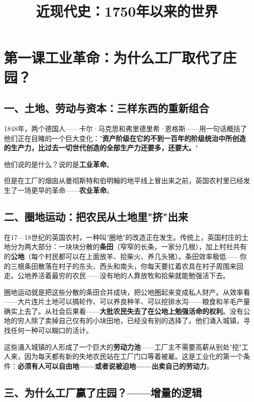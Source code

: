 \documentclass[a4paper,12pt]{ctexart}
\title{\textcolor{blue!70!black}{\Huge\textbf{近现代史：1750年以来的世界}}}
\author{}
\date{}
\begin{document}
\maketitle
\thispagestyle{empty}

\tableofcontents
\newpage

\section{\textcolor{orange!80!black}{第一课\quad 工业革命：为什么工厂取代了庄园？}}

\subsection*{一、土地、劳动与资本：三样东西的重新组合}

1848年，两个德国人——卡尔·马克思和弗里德里希·恩格斯——用一句话概括了他们正在目睹的一个巨大变化："\textbf{资产阶级在它的不到一百年的阶级统治中所创造的生产力，比过去一切世代创造的全部生产力还要多，还要大。}"

他们说的是什么？说的是\textbf{工业革命}。

但是在工厂的烟囱从曼彻斯特和伯明翰的地平线上冒出来之前，英国农村里已经发生了一场更早的革命——\textbf{农业革命}。

\subsection*{二、圈地运动：把农民从土地里"挤"出来}

在17—18世纪的英国农村，一种叫"圈地"的改造正在发生。传统上，英国村庄的土地分为两大部分：一块块分散的\textbf{条田}（窄窄的长条，一家分几根），加上村社共有的\textbf{公地}（每个村民都可以在上面放羊、拾柴火、养几头猪）。条田效率极低——你的三根条田散落在村子的东头、西头和南头，你每天要扛着农具在村子周围来回走。公地养活着最穷的农民——没有地的人靠放牧和拾柴就能勉强活下去。

圈地运动就是把这些分散的条田合并成块，把公地圈起来变成私人财产。从效率看——大片连片土地可以搞轮作、可以养良种羊、可以挖排水沟——粮食和羊毛产量确实上去了。从社会后果看——\textbf{大批农民失去了在公地上勉强活命的权利}。没有公地的穷人除了卖掉自己仅有的小块田地，已经没有别的选择了。他们涌入城镇，寻找任何一种可以糊口的活计。

这些涌入城镇的人形成了一个巨大的\textbf{劳动力池}——工厂主不需要高薪从别处"挖"工人来，因为每天都有新的失地农民站在工厂门口等着被雇。这是工业化的第一个条件：\textbf{必须有人可以自由地——或者说被迫地——出卖自己的劳动力}。

\subsection*{三、为什么工厂赢了庄园？——增量的逻辑}
\end{document}

